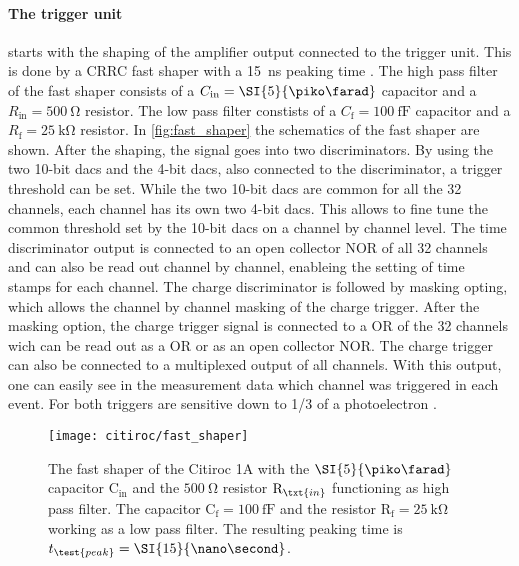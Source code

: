 \paragraph{The trigger unit} starts with the shaping of the amplifier output connected to the trigger unit. 
This is done by a CRRC fast shaper with a \SI{15}{\nano\second} peaking time \cite{citiroc}. 
The high pass filter of the fast shaper consists of a $C_\text{in}=\SI{5}{\piko\farad}$ capacitor and a $R_\text{in}=\SI{500}{\ohm}$ resistor.
The low pass filter constists of a $C_\text{f}=\SI{100}{\femto\farad}$ capacitor and a $R_\text{f}=\SI{25}{\kilo\ohm}$ resistor.
In \autoref{fig:fast_shaper} the schematics of the fast shaper are shown.
After the shaping, the signal goes into two discriminators.
By using the two 10-bit \ac{dac}s and the 4-bit \ac{dac}s, also connected to the discriminator, a trigger threshold can be set.
While the two 10-bit \ac{dac}s are common for all the 32 channels, each channel has its own two 4-bit \ac{dac}s.
This allows to fine tune the common threshold set by the 10-bit \ac{dac}s on a channel by channel level.
The time discriminator output is connected to an open collector NOR of all 32 channels and can also be read out channel by channel, enableing the setting of time stamps for each channel.
The charge discriminator is followed by masking opting, which allows the channel by channel masking of the charge trigger. 
After the masking option, the charge trigger signal is connected to a OR of the 32 channels wich can be read out as a OR or as an open collector NOR.
The charge trigger can also be connected to a multiplexed output of all channels.
With this output, one can easily see in the measurement data which channel was triggered in each event.
For both triggers are sensitive down to 1/3 of a photoelectron \cite{citiroc}.

\begin{figure}
	\centering
	\texttt{[image: citiroc/fast\_shaper]}
	\caption[Citiroc 1A fast shaper schematic]{The fast shaper of the Citiroc 1A with the $\SI{5}{\piko\farad}$ capacitor $\text{C}_\text{in}$ and the $\SI{500}{\ohm}$ resistor $\text{R}_\txt{in}$ functioning as high pass filter. The capacitor $\text{C}_\text{f}=\SI{100}{\femto\farad}$ and the resistor $\text{R}_\text{f}=\SI{25}{\kilo\ohm}$ working as a low pass filter. The resulting peaking time is $t_\test{peak}=\SI{15}{\nano\second}$. \cite{citiroc}}
	\label{fig:fast_shaper}
\end{figure}


